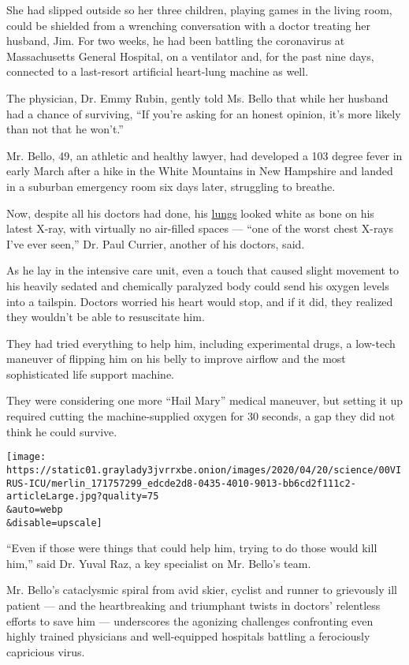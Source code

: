 She had slipped outside so her three children, playing games in the
living room, could be shielded from a wrenching conversation with a
doctor treating her husband, Jim. For two weeks, he had been battling
the coronavirus at Massachusetts General Hospital, on a ventilator and,
for the past nine days, connected to a last-resort artificial heart-lung
machine as well.

The physician, Dr. Emmy Rubin, gently told Ms. Bello that while her
husband had a chance of surviving, ``If you're asking for an honest
opinion, it's more likely than not that he won't.''

Mr. Bello, 49, an athletic and healthy lawyer, had developed a 103
degree fever in early March after a hike in the White Mountains in New
Hampshire and landed in a suburban emergency room six days later,
struggling to breathe.

Now, despite all his doctors had done, his
\href{https://www.nytimes3xbfgragh.onion/interactive/2020/05/08/health/coronavirus-covid-lungs-ventilators.html}{lungs}
looked white as bone on his latest X-ray, with virtually no air-filled
spaces --- ``one of the worst chest X-rays I've ever seen,'' Dr. Paul
Currier, another of his doctors, said.

As he lay in the intensive care unit, even a touch that caused slight
movement to his heavily sedated and chemically paralyzed body could send
his oxygen levels into a tailspin. Doctors worried his heart would stop,
and if it did, they realized they wouldn't be able to resuscitate him.

They had tried everything to help him, including experimental drugs, a
low-tech maneuver of flipping him on his belly to improve airflow and
the most sophisticated life support machine.

They were considering one more ``Hail Mary'' medical maneuver, but
setting it up required cutting the machine-supplied oxygen for 30
seconds, a gap they did not think he could survive.

\texttt{[image: https://static01.graylady3jvrrxbe.onion/images/2020/04/20/science/00VIRUS-ICU/merlin\_171757299\_edcde2d8-0435-4010-9013-bb6cd2f111c2-articleLarge.jpg?quality=75\\\&auto=webp\\\&disable=upscale]}

``Even if those were things that could help him, trying to do those
would kill him,'' said Dr. Yuval Raz, a key specialist on Mr. Bello's
team.

Mr. Bello's cataclysmic spiral from avid skier, cyclist and runner to
grievously ill patient --- and the heartbreaking and triumphant twists
in doctors' relentless efforts to save him --- underscores the agonizing
challenges confronting even highly trained physicians and well-equipped
hospitals battling a ferociously capricious virus.

